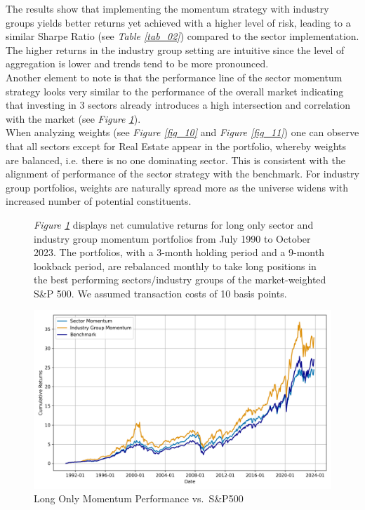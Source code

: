 \documentclass[a4paper,12pt,twoside]{article}
\begin{document}
    The results show that implementing the momentum strategy with industry groups yields better returns yet achieved with a higher level of risk, leading to a similar Sharpe Ratio (see \textit{Table \ref{tab_02}}) compared to the sector implementation. The higher returns in the industry group setting are intuitive since the level of aggregation is lower and trends tend to be more pronounced.\\
    
    Another element to note is that the performance line of the sector momentum strategy looks very similar to the performance of the overall market indicating that investing in 3 sectors already introduces a high intersection and correlation with the market (see \textit{Figure \ref{fig_01}}).\\
    
    When analyzing weights (see \textit{Figure \ref{fig_10}} and \textit{Figure \ref{fig_11}}) one can observe that all sectors except for Real Estate appear in the portfolio,  whereby weights are balanced, i.e. there is no one dominating sector. This is consistent with the alignment of performance of the sector strategy with the benchmark. For industry group portfolios, weights are naturally spread more as the universe widens with increased number of potential constituents. \\

\begin{figure}[H] 
        \caption{Long Only Momentum Performance vs.~S\&P500} 
    \label{fig_01}
    \textit{Figure \ref{fig_01}} displays net cumulative returns for long only sector and industry group momentum portfolios from July 1990 to October 2023. The portfolios, with a 3-month holding period and a 9-month lookback period, are rebalanced monthly to take long positions in the best performing sectors/industry groups of the market-weighted S\&P 500. We assumed transaction costs of 10 basis points.
\captionsetup{justification=centering}
\centerline{\includegraphics[width=1\textwidth]{Plots/strategy_plot.png}}
\end{figure}
\end{document}
